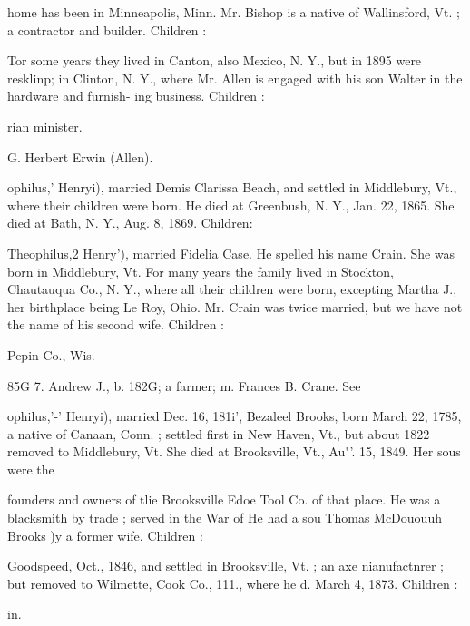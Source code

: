\documentclass[oneside]{book}
\begin{document}
home has been in Minneapolis, Minn. Mr. Bishop is a native 
of Wallinsford, Vt. ; a contractor and builder. Children : 



Tor some years they lived in Canton, also Mexico, N. Y., 
but in 1895 were resklinp; in Clinton, N. Y., where Mr. Allen 
is engaged with his son Walter in the hardware and furnish- 
ing business. Children : 




rian minister. 



G. Herbert Erwin (Allen). 



ophilus,' Henryi), married Demis Clarissa Beach, and settled in 
Middlebury, Vt., where their children were born. He died at 
Greenbush, N. Y., Jan. 22, 1865. She died at Bath, N. Y., 
Aug. 8, 1869. Children: 






Theophilus,2 Henry'), married Fidelia Case. He spelled his 
name Crain. She was born in Middlebury, Vt. For many years 
the family lived in Stockton, Chautauqua Co., N. Y., where all 
their children were born, excepting Martha J., her birthplace 
being Le Roy, Ohio. Mr. Crain was twice married, but we have 
not the name of his second wife. Children : 



Pepin Co., Wis. 


85G 7. Andrew J., b. 182G; a farmer; m. Frances B. Crane. See 


ophilus,'-' Henryi), married Dec. 16, 181i', Bezaleel Brooks, born 
March 22, 1785, a native of Canaan, Conn. ; settled first in New 
Haven, Vt., but about 1822 removed to Middlebury, Vt. She 
died at Brooksville, Vt., Au"'. 15, 1849. Her sous were the 




founders and owners of tlie Brooksville Edoe Tool Co. of that 
place. He was a blacksmith by trade ; served in the War of 
He had a sou Thomas McDououuh Brooks )y a former wife. 
Children : 







Goodspeed, Oct., 1846, and settled in Brooksville, Vt. ; an axe 
nianufactnrer ; but removed to Wilmette, Cook Co., 111., 
where he d. March 4, 1873. Children : 


in. 
\end{document}

